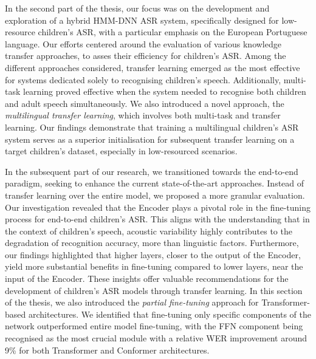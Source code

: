 In the second part of the thesis, our focus was on the development and exploration of a hybrid \ac{HMM-DNN} \ac{ASR} system, specifically designed for low-resource children's \ac{ASR}, with a particular emphasis on the European Portuguese language. Our efforts centered around the evaluation of various knowledge transfer approaches, to asses their efficiency for children's \ac{ASR}. Among the different approaches considered, transfer learning emerged as the most effective for systems dedicated solely to recognising children's speech. Additionally, multi-task learning proved effective when the system needed to recognise both children and adult speech simultaneously. We also introduced a novel approach, the \textit{multilingual transfer learning}, which involves both multi-task and transfer learning. Our findings demonstrate that training a multilingual children's \ac{ASR} system serves as a superior initialisation for subsequent transfer learning on a target children's dataset, especially in low-resourced scenarios.

In the subsequent part of our research, we transitioned towards the end-to-end paradigm, seeking to enhance the current state-of-the-art approaches. Instead of transfer learning over the entire model, we proposed a more granular evaluation. Our investigation revealed that the Encoder plays a pivotal role in the fine-tuning process for end-to-end children's \ac{ASR}. This aligns with the understanding that in the context of children's speech, acoustic variability highly contributes to the degradation of recognition accuracy, more than linguistic factors. Furthermore, our findings highlighted that higher layers, closer to the output of the Encoder, yield more substantial benefits in fine-tuning compared to lower layers, near the input of the Encoder. These insights offer valuable recommendations for the development of children's \ac{ASR} models through transfer learning. In this section of the thesis, we also introduced the \textit{partial fine-tuning} approach for Transformer-based architectures. We identified that fine-tuning only specific components of the network outperformed entire model fine-tuning, with the \ac{FFN} component being recognised as the most crucial module with a relative \ac{WER} improvement around 9\% for both Transformer and Conformer architectures.

